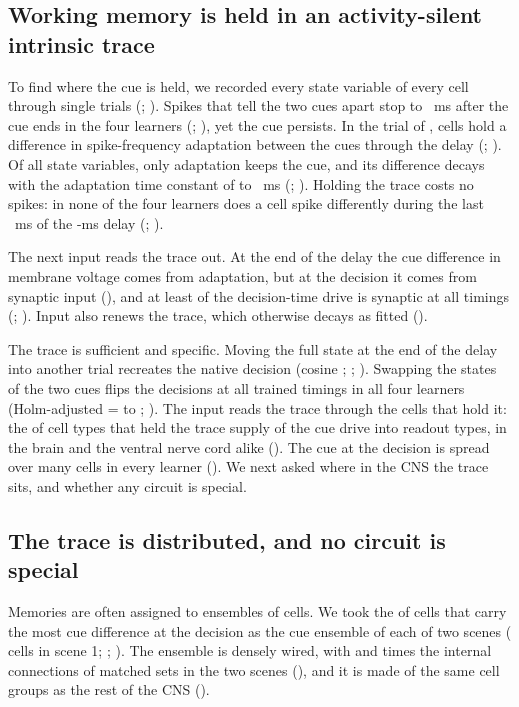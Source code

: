 \subsection{Working memory is held in an activity-silent intrinsic trace}

To find where the cue is held, we recorded every state variable of every cell through single trials (; ).
Spikes that tell the two cues apart stop  to ~ms after the cue ends in the four learners (;
), yet the cue persists. In the trial of ,  cells hold a difference in spike-frequency adaptation
between the cues through the delay (; ). Of all state variables, only adaptation keeps the cue, and its
difference decays with the adaptation time constant of  to ~ms (; ). Holding the trace costs
no spikes: in none of the four learners does a cell spike differently during the last ~ms of the -ms delay
(; ).

The next input reads the trace out. At the end of the delay the cue difference in membrane voltage comes from adaptation, but at
the decision it comes from synaptic input (), and at least  of the decision-time drive is synaptic at all
 timings (; ). Input also renews the trace, which otherwise decays as fitted ().

The trace is sufficient and specific. Moving the full state at the end of the delay into another trial recreates the native
decision (cosine ; ; ). Swapping the states of the two cues flips the decisions at all trained timings
in all four learners (Holm-adjusted \Pv{} =  to ; ). The input reads the trace through the
cells that hold it: the  of cell types that held the trace supply  of the cue drive into readout types, in the
brain and the ventral nerve cord alike (). The cue at the decision is spread over many cells in every learner
(). We next asked where in the CNS the trace sits, and whether any circuit is special.

\subsection{The trace is distributed, and no circuit is special}

Memories are often assigned to ensembles of cells. We took the  of cells that carry the most cue
difference at the decision as the cue ensemble of each of two scenes ( cells in scene 1; ; ). The
ensemble is densely wired, with  and  times the internal connections of  matched sets in the two
scenes (), and it is made of the same cell groups as the rest of the CNS ().

